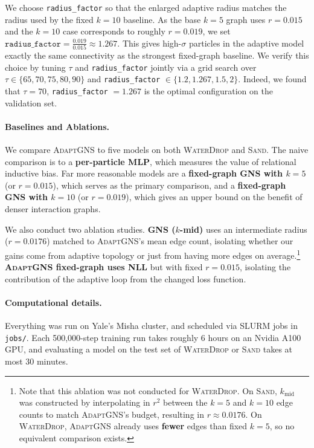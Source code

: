 \documentclass{article}
\begin{document}
We choose \texttt{radius\_factor} so that the enlarged adaptive radius matches
the radius used by the fixed $k=10$ baseline. As the base $k=5$ graph uses
$r = 0.015$ and the $k=10$ case corresponds to roughly
$r = 0.019$, we set $
  \texttt{radius\_factor}
  =
  \frac{0.019}{0.015}
  \approx 1.267.$
This gives high-$\sigma$ particles in the adaptive model exactly the same connectivity as the strongest fixed-graph baseline.
We verify this choice by tuning $\tau$ and \texttt{radius\_factor} jointly via a grid search over $\tau \in \{65, 70, 75, 80, 90\}$ and \texttt{radius\_factor} $\in \{1.2, 1.267, 1.5, 2\}$. Indeed, we found that $\tau = 70$, \texttt{radius\_factor} $= 1.267$ is the optimal configuration on the validation set.
\paragraph{Baselines and Ablations.} We compare \textsc{AdaptGNS} to five models on both \textsc{WaterDrop} and \textsc{Sand}. The naive comparison is to a \textbf{per-particle MLP}, which measures the value of relational inductive bias. Far more reasonable models are a \textbf{fixed-graph GNS with $k = 5$} (or $r = 0.015$), which serves as the primary comparison, and a \textbf{fixed-graph GNS with $k = 10$} (or $r = 0.019$), which gives an upper bound on the benefit of denser interaction graphs. 

We also conduct two ablation studies. \textbf{GNS ($k$-mid)} uses an intermediate radius ($r=0.0176$) matched to \textsc{AdaptGNS}'s mean edge count, isolating whether our gains come from adaptive topology or just from having more edges on average.\footnote{Note that this ablation was not conducted for \textsc{WaterDrop}. On \textsc{Sand}, $k_\text{mid}$ was constructed by interpolating in $r^2$ between the $k = 5$ and $k = 10$ edge counts to match \textsc{AdaptGNS}'s budget, resulting in $r \approx 0.0176$. On \textsc{WaterDrop}, \textsc{AdaptGNS} already uses \textbf{fewer} edges than fixed $k = 5$, so no equivalent comparison exists.}
\textbf{\textsc{AdaptGNS} fixed-graph uses NLL} but with fixed $r=0.015$, isolating the contribution of the adaptive loop from the changed loss function.

\paragraph{Computational details.} Everything was run on Yale's Misha cluster, and scheduled via SLURM jobs in \texttt{jobs/}. Each 500,000-step training run takes roughly 6 hours on an Nvidia A100 GPU, and evaluating a model on the test set of \textsc{WaterDrop} or \textsc{Sand} takes at most 30 minutes.
\end{document}
